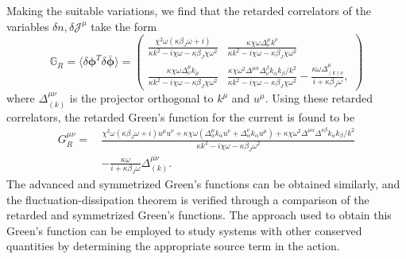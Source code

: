 \documentclass[aps,prd,nofootinbib,amsmath,amssymb,showpacs,longbibliography,singlecolumn,superscriptaddress,notitlepage]{revtex4-1}
\theoremstyle{plain}
\theoremstyle{definition}
\newcommand{\cvec}[1]{\ensuremath{\bm {#1}}}
\newcommand{\cmat}[1]{\ensuremath{\mathds{{#1}}}}
\begin{document}
Making the suitable variations, we find that the retarded correlators of the variables $\delta n, \delta \mathcal{J}^{\mu}$ take the form
\begin{equation}
    \cmat{G}_R = \langle \delta \cvec{\phi}^T \delta \bar{\cvec{\phi}} \rangle = \begin{pmatrix}
        \frac{\chi^2 \omega \left( \kappa \beta_J \omega + i \right)}{\kappa k^2 - i \chi \omega - \kappa \beta_J \chi \omega^2} & \frac{\kappa \chi \omega \Delta^{\mu}_{\nu} k^{\nu}}{\kappa k^2 - i \chi \omega - \kappa \beta_J \chi \omega^2} \\
        \frac{\kappa \chi \omega \Delta^{\mu}_{\nu} k_{\mu}}{\kappa k^2 - i \chi \omega - \kappa \beta_J \chi \omega^2} & \frac{\kappa \chi \omega^2 \Delta^{\mu\alpha} \Delta_{\nu}^{\beta} k_{\alpha} k_{\beta} / k^2}{\kappa k^2 - i \chi \omega - \kappa \beta_J \chi \omega^2} - \frac{\kappa \omega \Delta_{(k)\nu}^{\mu}}{i + \kappa \beta_J \omega} ,
    \end{pmatrix}
\end{equation}
where $\Delta_{(k)}^{\mu\nu}$ is the projector orthogonal to $k^{\mu}$ and $u^{\mu}$. Using these retarded correlators, the retarded Green's function for the current is found to be 
\begin{equation} \label{GR_Eckart}
\begin{split}
    G_R^{\mu\nu} = \, & \frac{\chi^2 \omega \left( \kappa \beta_J \omega + i \right) u^{\mu} u^{\nu} + \kappa \chi \omega ( \Delta^{\mu}_{\alpha} k_{\alpha} u^{\nu} + \Delta^{\nu}_{\alpha} k_{\alpha} u^{\mu}) + \kappa \chi \omega^2 \Delta^{\mu\alpha} \Delta^{\nu\beta} k_{\alpha} k_{\beta} / k^2}{\kappa k^2 - i \chi \omega - \kappa \beta_J \omega^2}  \\
    & - \frac{\kappa \omega}{i + \kappa \beta_J \omega} \Delta_{(k)}^{\mu\nu} .
\end{split}
\end{equation}
The advanced and symmetrized Green's functions can be obtained similarly, and the fluctuation-dissipation theorem is verified through a comparison of the retarded and symmetrized Green's functions. The approach used to obtain this Green's function can be employed to study systems with other conserved quantities by determining the appropriate source term in the action.
\end{document}
